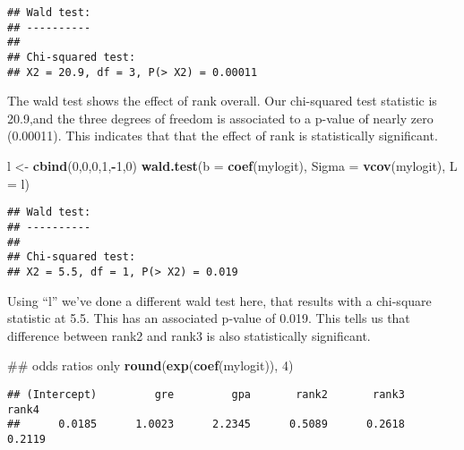 \documentclass[]{article}
\newenvironment{Shaded}{\begin{snugshade}}{\end{snugshade}}
\newcommand{\KeywordTok}[1]{\textcolor[rgb]{0.13,0.29,0.53}{\textbf{#1}}}
\newcommand{\DataTypeTok}[1]{\textcolor[rgb]{0.13,0.29,0.53}{#1}}
\newcommand{\DecValTok}[1]{\textcolor[rgb]{0.00,0.00,0.81}{#1}}
\newcommand{\StringTok}[1]{\textcolor[rgb]{0.31,0.60,0.02}{#1}}
\newcommand{\OperatorTok}[1]{\textcolor[rgb]{0.81,0.36,0.00}{\textbf{#1}}}
\newcommand{\NormalTok}[1]{#1}
\begin{document}
\begin{verbatim}
## Wald test:
## ----------
## 
## Chi-squared test:
## X2 = 20.9, df = 3, P(> X2) = 0.00011
\end{verbatim}

The wald test shows the effect of rank overall. Our chi-squared test
statistic is 20.9,and the three degrees of freedom is associated to a
p-value of nearly zero (0.00011). This indicates that that the effect of
rank is statistically significant.

\begin{Shaded}
\begin{Highlighting}[]
\NormalTok{l <-}\StringTok{ }\KeywordTok{cbind}\NormalTok{(}\DecValTok{0}\NormalTok{,}\DecValTok{0}\NormalTok{,}\DecValTok{0}\NormalTok{,}\DecValTok{1}\NormalTok{,}\OperatorTok{-}\DecValTok{1}\NormalTok{,}\DecValTok{0}\NormalTok{) }
\KeywordTok{wald.test}\NormalTok{(}\DataTypeTok{b =} \KeywordTok{coef}\NormalTok{(mylogit), }\DataTypeTok{Sigma =} \KeywordTok{vcov}\NormalTok{(mylogit), }\DataTypeTok{L =}\NormalTok{ l)}
\end{Highlighting}
\end{Shaded}

\begin{verbatim}
## Wald test:
## ----------
## 
## Chi-squared test:
## X2 = 5.5, df = 1, P(> X2) = 0.019
\end{verbatim}

Using ``l'' we've done a different wald test here, that results with a
chi-square statistic at 5.5. This has an associated p-value of 0.019.
This tells us that difference between rank2 and rank3 is also
statistically significant.

\begin{Shaded}
\begin{Highlighting}[]
\NormalTok{## odds ratios only }
\KeywordTok{round}\NormalTok{(}\KeywordTok{exp}\NormalTok{(}\KeywordTok{coef}\NormalTok{(mylogit)), }\DecValTok{4}\NormalTok{)}
\end{Highlighting}
\end{Shaded}

\begin{verbatim}
## (Intercept)         gre         gpa       rank2       rank3       rank4 
##      0.0185      1.0023      2.2345      0.5089      0.2618      0.2119
\end{verbatim}

\begin{Shaded}
\end{Shaded}
\end{document}
